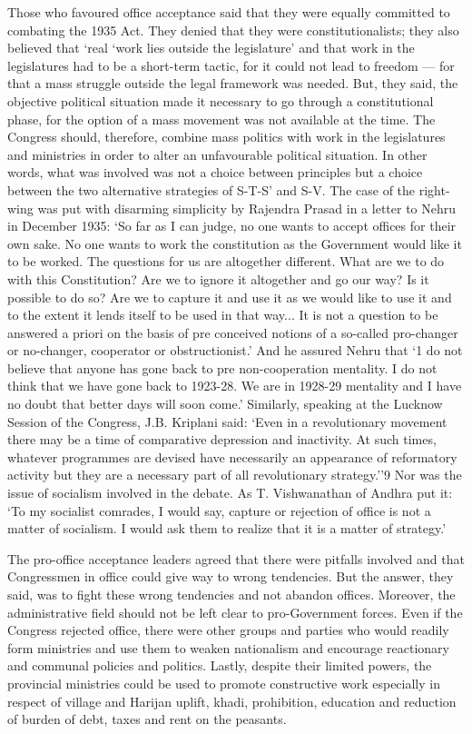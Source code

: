 Those who favoured office acceptance said that they were equally committed to combating the 1935 Act. They denied that they were constitutionalists; they also believed that `real `work lies outside the legislature' and that work in the legislatures had to be a short-term tactic, for it could not lead to freedom — for that a mass struggle outside the legal framework was needed. But, they said, the objective political situation made it necessary to go through a constitutional phase, for the option of a mass movement was not available at the time. The Congress should, therefore, combine mass politics with work in the legislatures and ministries in order to alter an unfavourable political situation. In other words, what was involved was not a choice between principles but a choice between the two alternative strategies of S-T-S' and S-V. The case of the right-wing was put with disarming simplicity by Rajendra Prasad in a letter to Nehru in December 1935: `So far as I can judge, no one wants to accept offices for their own sake. No one wants to work the constitution as the Government would like it to be worked. The questions for us are altogether different. What are we to do with this Constitution? Are we to ignore it altogether and go our way? Is it possible to do so? Are we to capture it and use it as we would like to use it and to the extent it lends itself to be used in that way... It is not a question to be answered a priori on the basis of pre­ conceived notions of a so-called pro-changer or no-changer, cooperator or obstructionist.' And he assured Nehru that `1 do not believe that anyone has gone back to pre non-cooperation mentality. I do not think that we have gone back to 1923-28. We are in 1928-29 mentality and I have no doubt that better days will soon come.' Similarly, speaking at the Lucknow Session of the Congress, J.B. Kriplani said: `Even in a revolutionary movement there may be a time of comparative depression and inactivity. At such times, whatever programmes are devised have necessarily an appearance of reformatory activity but they are a necessary part of all revolutionary strategy.''9 Nor was the issue of socialism involved in the debate. As T. Vishwanathan of Andhra put it: `To my socialist comrades, I would say, capture or rejection of office is not a matter of socialism. I would ask them to realize that it is a matter of strategy.' 

The pro-office acceptance leaders agreed that there were pitfalls involved and that Congressmen in office could give way to wrong tendencies. But the answer, they said, was to fight these wrong tendencies and not abandon offices. Moreover, the administrative field should not be left clear to pro-Government forces. Even if the Congress rejected office, there were other groups and parties who would readily form ministries and use them to weaken nationalism and encourage reactionary and communal policies and politics. Lastly, despite their limited powers, the provincial ministries could be used to promote constructive work especially in respect of village and Harijan uplift, khadi, prohibition, education and reduction of burden of debt, taxes and rent on the peasants. 

